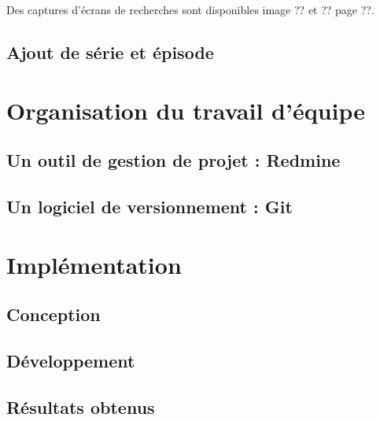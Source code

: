 \documentclass[12pt,a4paper,openany]{book}
\begin{document}
	Des captures d'écrans de recherches sont disponibles image ?? et ?? page ??. %
	\section{Ajout de série et épisode}
	\chapter{Organisation du travail d'équipe}
	\section{Un outil de gestion de projet : Redmine}
	\section{Un logiciel de versionnement : Git}
	\chapter{Implémentation}
	\section{Conception}
	\section{Développement}
	\section{Résultats obtenus}
\end{document}
